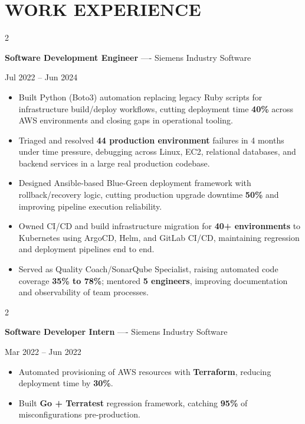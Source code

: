 \documentclass[10pt, letterpaper]{article}
\newenvironment{highlights}{
    \begin{itemize}[
        topsep=0.10 cm,
        parsep=0.06 cm,
        partopsep=0pt,
        itemsep=0.06 cm,
        leftmargin=12pt
    ]
}{
    \end{itemize}
}
\newenvironment{twocolentry}[2][]{
    \onecolentry
    \def\secondColumn{#2}
    \setcolumnwidth{\fill, 4.5 cm}
    \begin{paracol}{2}
}{
    \switchcolumn \raggedleft \secondColumn
    \end{paracol}
    \endonecolentry
}
\begin{document}
\section{WORK EXPERIENCE}
\begin{twocolentry}{Jul 2022 -- Jun 2024}
\textbf{Software Development Engineer} ---- Siemens Industry Software
\end{twocolentry}
\begin{highlights}
  \item Built Python (Boto3) automation replacing legacy Ruby scripts for infrastructure build/deploy workflows, cutting deployment time \textbf{40\%} across AWS environments and closing gaps in operational tooling.
  \item Triaged and resolved \textbf{44 production environment} failures in 4 months under time pressure, debugging across Linux, EC2, relational databases, and backend services in a large real production codebase.
  \item Designed Ansible-based Blue-Green deployment framework with rollback/recovery logic, cutting production upgrade downtime \textbf{50\%} and improving pipeline execution reliability.
  \item Owned CI/CD and build infrastructure migration for \textbf{40+ environments} to Kubernetes using ArgoCD, Helm, and GitLab CI/CD, maintaining regression and deployment pipelines end to end.
  \item Served as Quality Coach/SonarQube Specialist, raising automated code coverage \textbf{35\% to 78\%}; mentored \textbf{5 engineers}, improving documentation and observability of team processes.
\end{highlights}

\vspace{0.15 cm}

\begin{twocolentry}{Mar 2022 -- Jun 2022}
\textbf{Software Developer Intern} ---- Siemens Industry Software
\end{twocolentry}
\begin{highlights}
  \item Automated provisioning of AWS resources with \textbf{Terraform}, reducing deployment time by \textbf{30\%}.
  \item Built \textbf{Go + Terratest} regression framework, catching \textbf{95\%} of misconfigurations pre-production.
\end{highlights}

\vspace{0.15 cm}
\end{document}

